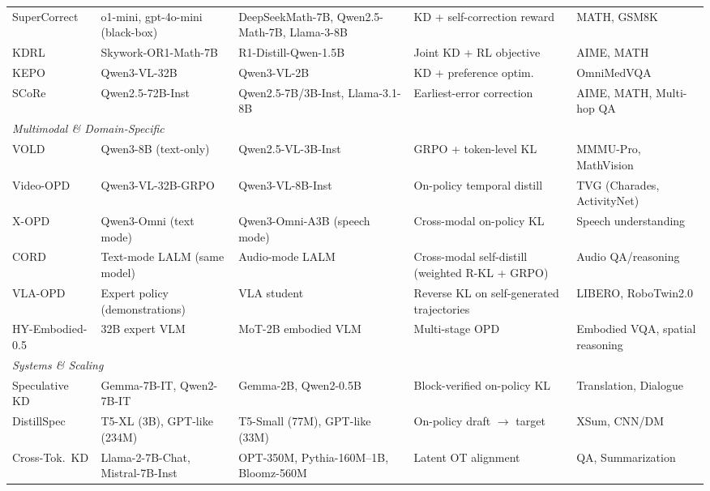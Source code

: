 \documentclass{article} %
\begin{document}
\begin{table}[t]
{\begin{tabular}{@{}lllll@{}}
        SuperCorrect \citep{2410.09008} & o1-mini, gpt-4o-mini (black-box) & DeepSeekMath-7B, Qwen2.5-Math-7B, Llama-3-8B & KD + self-correction reward & MATH, GSM8K \\
        KDRL \citep{2506.02208} & Skywork-OR1-Math-7B & R1-Distill-Qwen-1.5B & Joint KD + RL objective & AIME, MATH \\
        KEPO \citep{2602.00400} & Qwen3-VL-32B & Qwen3-VL-2B & KD + preference optim. & OmniMedVQA \\
        SCoRe \citep{2509.14257} & Qwen2.5-72B-Inst & Qwen2.5-7B/3B-Inst, Llama-3.1-8B & Earliest-error correction & AIME, MATH, Multi-hop QA \\
        \midrule
        \multicolumn{5}{l}{\textit{Multimodal \& Domain-Specific}} \\
        \midrule
        VOLD \citep{2510.23497} & Qwen3-8B (text-only) & Qwen2.5-VL-3B-Inst & GRPO + token-level KL & MMMU-Pro, MathVision \\
        Video-OPD \citep{2602.02994} & Qwen3-VL-32B-GRPO & Qwen3-VL-8B-Inst & On-policy temporal distill & TVG (Charades, ActivityNet) \\
        X-OPD \citep{2603.24596} & Qwen3-Omni (text mode) & Qwen3-Omni-A3B (speech mode) & Cross-modal on-policy KL & Speech understanding \\
        CORD \citep{hu2026cord} & Text-mode LALM (same model) & Audio-mode LALM & Cross-modal self-distill (weighted R-KL + GRPO) & Audio QA/reasoning \\
        VLA-OPD \citep{zhong2026vlaopd} & Expert policy (demonstrations) & VLA student & Reverse KL on self-generated trajectories & LIBERO, RoboTwin2.0 \\
        HY-Embodied-0.5 \citep{tencent2026hyembodied} & 32B expert VLM & MoT-2B embodied VLM & Multi-stage OPD & Embodied VQA, spatial reasoning \\
        \midrule
        \multicolumn{5}{l}{\textit{Systems \& Scaling}} \\
        \midrule
        Speculative KD \citep{2410.11325} & Gemma-7B-IT, Qwen2-7B-IT & Gemma-2B, Qwen2-0.5B & Block-verified on-policy KL & Translation, Dialogue \\
        DistillSpec \citep{2310.08461} & T5-XL (3B), GPT-like (234M) & T5-Small (77M), GPT-like (33M) & On-policy draft $\to$ target & XSum, CNN/DM \\
        Cross-Tok.\ KD \citep{2402.12030} & Llama-2-7B-Chat, Mistral-7B-Inst & OPT-350M, Pythia-160M--1B, Bloomz-560M & Latent OT alignment & QA, Summarization \\

\end{tabular}}
\end{table}
\end{document}
